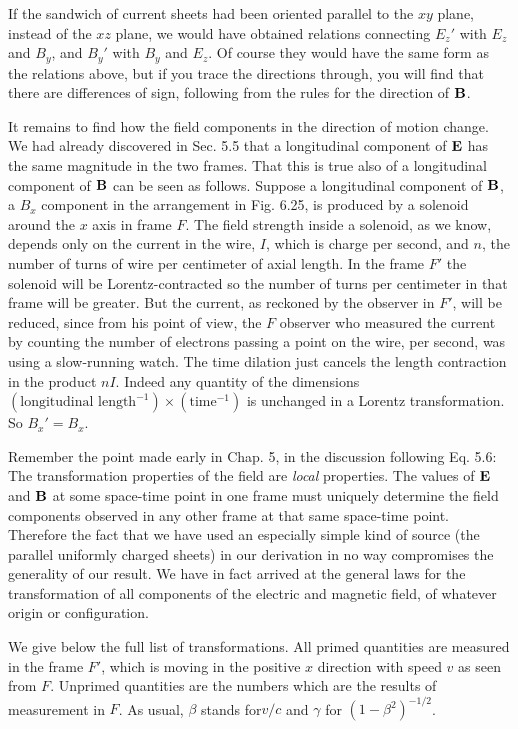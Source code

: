 If the sandwich of current sheets had been oriented parallel to the
$xy$ plane, instead of the $xz$ plane, we would have obtained relations
connecting $E_z'$ with $E_z$ and $B_y$, and $B_y'$ with $B_y$ and $E_z$. Of course they
would have the same form as the relations above, but if you trace
the directions through, you will find that there are differences of sign,
following from the rules for the direction of $\mathbf{B}$.

It remains to find how the field components in the direction of
motion change. We had already discovered in Sec. 5.5 that a longitudinal
component of $\mathbf{E}$ has the same magnitude in the two frames.
That this is true also of a longitudinal component of $\mathbf{B}$ can be seen
as follows. Suppose a longitudinal component of $\mathbf{B}$, a $B_x$ component
in the arrangement in Fig. 6.25, is produced by a solenoid around the
$x$ axis in frame $F$. The field strength inside a solenoid, as we know,
depends only on the current in the wire, $I$, which is charge per second,
and $n$, the number of turns of wire per centimeter of axial length.
In the frame $F'$ the solenoid will be Lorentz-contracted so the number
of turns per centimeter in that frame will be greater. But the current,
as reckoned by the observer in $F'$, will be reduced, since from his point
of view, the $F$ observer who measured the current by counting the
number of electrons passing a point on the wire, per second, was
using a slow-running watch. The time dilation just cancels the length
contraction in the product $nI$. Indeed any quantity of the dimensions
$(\text{longitudinal length}^{-1})\times(\text{time}^{-1})$ is unchanged in a Lorentz 
transformation. So $B_x' = B_x$.

Remember the point made early in Chap. 5, in the discussion
following Eq. 5.6: The transformation properties of the field are \emph{local}
properties. The values of $\mathbf{E}$ and $\mathbf{B}$ at some space-time point in one
frame must uniquely determine the field components observed in
any other frame at that same space-time point. Therefore the fact
that we have used an especially simple kind of source (the parallel
uniformly charged sheets) in our derivation in no way compromises
the generality of our result. We have in fact arrived at the general
laws for the transformation of all components of the electric and
magnetic field, of whatever origin or configuration.

We give below the full list of transformations. All primed
quantities are measured in the frame $F'$, which is moving in the positive
$x$ direction with speed $v$ as seen from $F$. Unprimed quantities
are the numbers which are the results of measurement in $F$. As usual,
$\beta$ stands for$v/c$ and $\gamma$ for $(1-\beta^2)^{-1/2}$.


